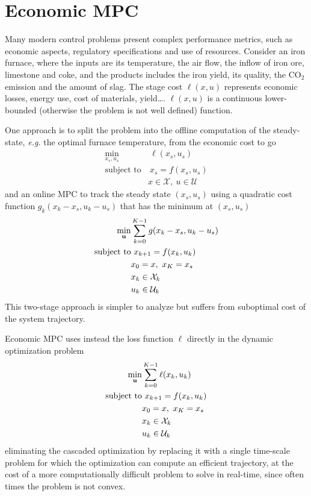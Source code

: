 \chapter{Economic MPC}
\label{chap:economic-mpc}

Many modern control problems present complex performance metrics, such as economic aspects, regulatory specifications and use of resources. Consider an iron furnace, where the inputs are its temperature, the air flow, the inflow of iron ore, limestone and coke, and the products includes the iron yield, its quality, the CO$_2$ emission and the amount of slag. The stage cost $\ell(x,u)$ represents economic losses, energy use, cost of materials, yield\ldots. $\ell(x,u)$ is a continuous lower-bounded (otherwise the problem is not well defined) function.

One approach is to split the problem into the offline computation of the steady-state, \textit{e.g.} the optimal furnace temperature, from the economic cost to go
\begin{align*}
  \min_{x_s,u_s} &\ \ell(x_s,u_s) \\
  \text{subject to} &\ x_s = f(x_s,u_s) \\
                 & x\in \mathcal{X},\ u\in \mathcal{U}
\end{align*}
and an online MPC to track the steady state $(x_s,u_s)$ using a quadratic cost function $g_k(x_k-x_s,u_k-u_s)$ that has the minimum at $(x_s,u_s)$
\begin{align*}
  \min_{\boldsymbol{\mathrm{u}}} & \sum_{k=0}^{K-1} g(x_k-x_s,u_k-u_s) \\
  \text{subject to} &\ x_{k+1} = f(x_k,u_k) \\
              & x_0 = x,\ x_K=x_s \\
              & x_k\in \mathcal{X}_k\\
              & u_k\in \mathcal{U}_k
\end{align*}
This two-stage approach is simpler to analyze but suffers from suboptimal cost of the system trajectory.

Economic MPC uses instead the loss function $\ell$ directly in the dynamic optimization problem
\begin{align*}
  \min_{\boldsymbol{\mathrm{u}}} & \sum_{k=0}^{K-1} \ell(x_k,u_k) \\
  \text{subject to} &\ x_{k+1} = f(x_k,u_k) \\
              & x_0 = x,\ x_K=x_s \\
              & x_k\in \mathcal{X}_k \\
              & u_k\in \mathcal{U}_k
\end{align*}
eliminating the cascaded optimization by replacing it with a single time-scale problem for which the optimization can compute an efficient trajectory, at the cost of a more computationally difficult problem to solve in real-time, since often times the problem is not convex.

